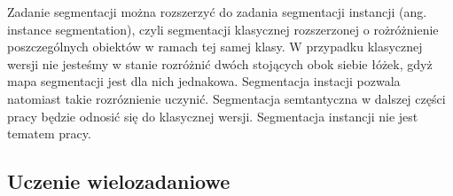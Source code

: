 Zadanie segmentacji można rozszerzyć do zadania segmentacji instancji (ang. instance segmentation), czyli segmentacji klasycznej rozszerzonej o rożróżnienie poszczególnych obiektów w ramach tej samej klasy. W przypadku klasycznej wersji nie jesteśmy w stanie rozróżnić dwóch stojących obok siebie łóżek, gdyż mapa segmentacji jest dla nich jednakowa. Segmentacja instacji pozwala natomiast takie rozróznienie uczynić. Segmentacja semtantyczna w dalszej części pracy będzie odnosić się do klasycznej wersji. Segmentacja instancji nie jest tematem pracy.
\subsection{Uczenie wielozadaniowe}
